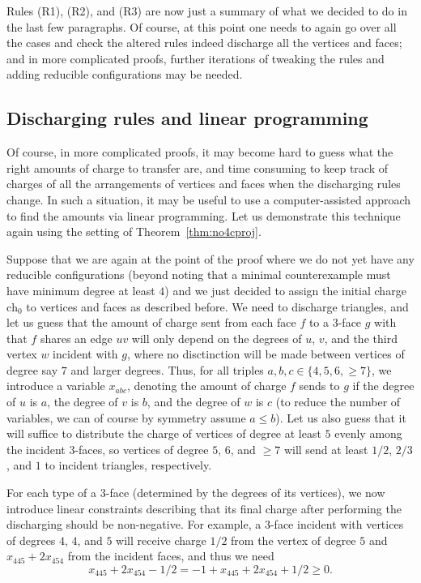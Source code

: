 \documentclass[12pt,twoside,openright,a4paper]{book}
\newcommand{\initch}{\text{ch}_0}
\begin{document}
Rules (R1), (R2), and (R3) are now just a summary of what we decided to do in the last few paragraphs.
Of course, at this point one needs to again go over all the cases and check the altered rules indeed
discharge all the vertices and faces; and in more complicated proofs, further iterations of tweaking the rules
and adding reducible configurations may be needed.

\subsection{Discharging rules and linear programming}\label{ssec:dischlp}

Of course, in more complicated proofs, it may become hard to guess what the right amounts of charge to
transfer are, and time consuming to keep track of charges of all the arrangements of vertices and faces
when the discharging rules change.  In such a situation, it may be useful to use a computer-assisted approach
to find the amounts via linear programming.  Let us demonstrate this technique again using the setting
of Theorem~\ref{thm:no4cproj}.

Suppose that we are again at the point of the proof where we do not yet have any reducible configurations
(beyond noting that a minimal counterexample must have minimum degree at least $4$)
and we just decided to assign the initial charge $\initch$ to vertices and faces as described before.
We need to discharge triangles, and let us guess that the amount of charge sent from each face $f$ to a $3$-face $g$
with that $f$ shares an edge $uv$ will only depend on the degrees of $u$, $v$, and the third vertex $w$ incident with $g$,
where no disctinction will
be made between vertices of degree say $7$ and larger degrees.  Thus, for all triples $a,b,c\in\{4,5,6,{\ge\!7}\}$,
we introduce a variable $x_{abc}$, denoting the amount of charge $f$ sends to $g$ if the degree of $u$ is $a$, the degree of $v$ is $b$,
and the degree of $w$ is $c$ (to reduce the number of variables, we can of course by symmetry assume $a\le b$).
Let us also guess that it will suffice to distribute the charge of vertices of degree at least $5$ evenly
among the incident $3$-faces, so vertices of degree $5$, $6$, and $\ge\!7$ will send at least $1/2$, $2/3$, and $1$ to incident triangles,
respectively.

For each type of a $3$-face (determined by the degrees of its vertices), we now introduce linear constraints
describing that its final charge after performing the discharging should be non-negative.  For example, a $3$-face
incident with vertices of degrees $4$, $4$, and $5$ will receive charge $1/2$ from the vertex of degree $5$ and
$x_{445}+2x_{454}$ from the incident faces, and thus we need
$$x_{445}+2x_{454}-1/2=-1+x_{445}+2x_{454}+1/2\ge 0.$$
\end{document}
